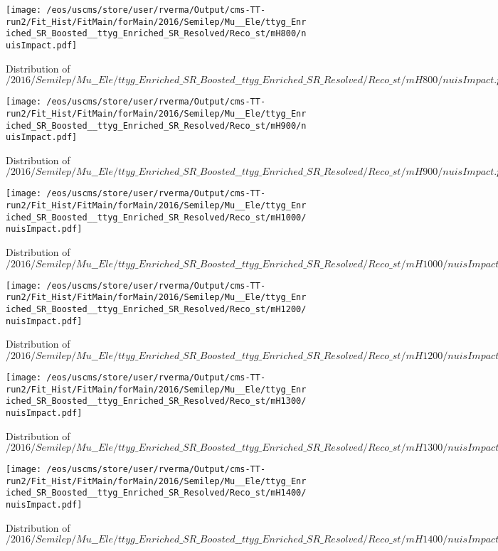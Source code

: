\begin{figure}
\centering
\texttt{[image: /eos/uscms/store/user/rverma/Output/cms-TT-run2/Fit\_Hist/FitMain/forMain/2016/Semilep/Mu\_\_Ele/ttyg\_Enriched\_SR\_Boosted\_\_ttyg\_Enriched\_SR\_Resolved/Reco\_st/mH800/nuisImpact.pdf]}
\caption{Distribution of $/2016/Semilep/Mu\_\_Ele/ttyg\_Enriched\_SR\_Boosted\_\_ttyg\_Enriched\_SR\_Resolved/Reco\_st/mH800/nuisImpact.pdf$}
\end{figure}

\begin{figure}
\centering
\texttt{[image: /eos/uscms/store/user/rverma/Output/cms-TT-run2/Fit\_Hist/FitMain/forMain/2016/Semilep/Mu\_\_Ele/ttyg\_Enriched\_SR\_Boosted\_\_ttyg\_Enriched\_SR\_Resolved/Reco\_st/mH900/nuisImpact.pdf]}
\caption{Distribution of $/2016/Semilep/Mu\_\_Ele/ttyg\_Enriched\_SR\_Boosted\_\_ttyg\_Enriched\_SR\_Resolved/Reco\_st/mH900/nuisImpact.pdf$}
\end{figure}

\begin{figure}
\centering
\texttt{[image: /eos/uscms/store/user/rverma/Output/cms-TT-run2/Fit\_Hist/FitMain/forMain/2016/Semilep/Mu\_\_Ele/ttyg\_Enriched\_SR\_Boosted\_\_ttyg\_Enriched\_SR\_Resolved/Reco\_st/mH1000/nuisImpact.pdf]}
\caption{Distribution of $/2016/Semilep/Mu\_\_Ele/ttyg\_Enriched\_SR\_Boosted\_\_ttyg\_Enriched\_SR\_Resolved/Reco\_st/mH1000/nuisImpact.pdf$}
\end{figure}

\begin{figure}
\centering
\texttt{[image: /eos/uscms/store/user/rverma/Output/cms-TT-run2/Fit\_Hist/FitMain/forMain/2016/Semilep/Mu\_\_Ele/ttyg\_Enriched\_SR\_Boosted\_\_ttyg\_Enriched\_SR\_Resolved/Reco\_st/mH1200/nuisImpact.pdf]}
\caption{Distribution of $/2016/Semilep/Mu\_\_Ele/ttyg\_Enriched\_SR\_Boosted\_\_ttyg\_Enriched\_SR\_Resolved/Reco\_st/mH1200/nuisImpact.pdf$}
\end{figure}

\begin{figure}
\centering
\texttt{[image: /eos/uscms/store/user/rverma/Output/cms-TT-run2/Fit\_Hist/FitMain/forMain/2016/Semilep/Mu\_\_Ele/ttyg\_Enriched\_SR\_Boosted\_\_ttyg\_Enriched\_SR\_Resolved/Reco\_st/mH1300/nuisImpact.pdf]}
\caption{Distribution of $/2016/Semilep/Mu\_\_Ele/ttyg\_Enriched\_SR\_Boosted\_\_ttyg\_Enriched\_SR\_Resolved/Reco\_st/mH1300/nuisImpact.pdf$}
\end{figure}

\begin{figure}
\centering
\texttt{[image: /eos/uscms/store/user/rverma/Output/cms-TT-run2/Fit\_Hist/FitMain/forMain/2016/Semilep/Mu\_\_Ele/ttyg\_Enriched\_SR\_Boosted\_\_ttyg\_Enriched\_SR\_Resolved/Reco\_st/mH1400/nuisImpact.pdf]}
\caption{Distribution of $/2016/Semilep/Mu\_\_Ele/ttyg\_Enriched\_SR\_Boosted\_\_ttyg\_Enriched\_SR\_Resolved/Reco\_st/mH1400/nuisImpact.pdf$}
\end{figure}

